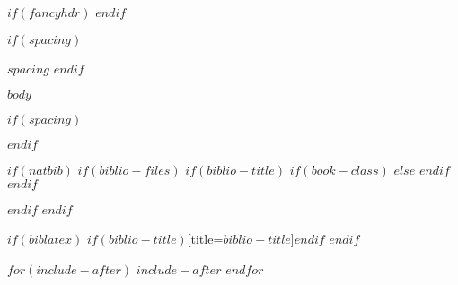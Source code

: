 \documentclass[$if(fontsize)$$fontsize$,$endif$$if(lang)$$lang$,$endif$$if(papersize)$$papersize$,$endif$$for(classoption)$$classoption$$sep$,$endfor$]{$documentclass$}
\begin{document}
\cleardoublepage

\mainmatter

$if(fancyhdr)$
\pagestyle{mainstyle}
$endif$

$if(spacing)$
\begin{spacing}{$spacing$}
$endif$

$body$

$if(spacing)$
\end{spacing}
$endif$


\backmatter

$if(natbib)$
$if(biblio-files)$
$if(biblio-title)$
$if(book-class)$
\renewcommand\bibname{$biblio-title$}
$else$
\renewcommand\refname{$biblio-title$}
$endif$
$endif$

$endif$
$endif$

$if(biblatex)$
\printbibliography$if(biblio-title)$[title=$biblio-title$]$endif$
$endif$

$for(include-after)$
$include-after$
$endfor$
\end{document}
